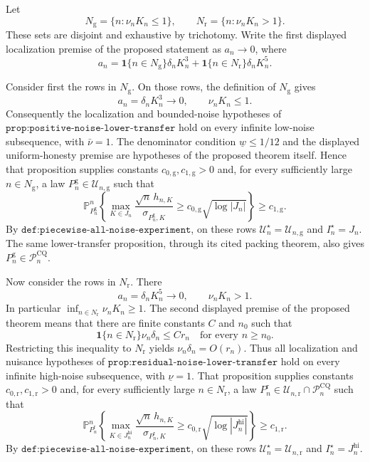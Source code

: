 Let
\[
 N_{\mathrm g}=\{n:\nu_nK_n\leq1\},
 \qquad
 N_{\mathrm r}=\{n:\nu_nK_n>1\}.
\]
These sets are disjoint and exhaustive by trichotomy.  Write the first displayed localization premise of the proposed statement as \(a_n\to0\), where
\[
 a_n=
 \mathbf 1\{n\in N_{\mathrm g}\}\delta_nK_n^3
 +\mathbf 1\{n\in N_{\mathrm r}\}\delta_nK_n^5.
\]

Consider first the rows in \(N_{\mathrm g}\).  On those rows, the definition of \(N_{\mathrm g}\) gives
\[
 a_n=\delta_nK_n^3\to0,
 \qquad
 \nu_nK_n\leq1.
\]
Consequently the localization and bounded-noise hypotheses of \(\texttt{prop:positive-noise-lower-transfer}\) hold on every infinite low-noise subsequence, with \(\bar\nu=1\).  The denominator condition \(\underline w\leq1/12\) and the displayed uniform-honesty premise are hypotheses of the proposed theorem itself.  Hence that proposition supplies constants \(c_{0,\mathrm g},c_{1,\mathrm g}>0\) and, for every sufficiently large \(n\in N_{\mathrm g}\), a law \(P_n^{\mathrm g}\in\mathcal U_{n,\mathrm g}\) such that
\[
 \mathbb P_{P_n^{\mathrm g}}^n\!\left\{
 \max_{K\in J_n}
 \frac{\sqrt n\,h_{n,K}}{\sigma_{P_n^{\mathrm g},K}}
 \geq c_{0,\mathrm g}\sqrt{\log|J_n|}
 \right\}\geq c_{1,\mathrm g}.
\]
By \(\texttt{def:piecewise-all-noise-experiment}\), on these rows \(\mathcal U_n^\star=\mathcal U_{n,\mathrm g}\) and \(I_n^\star=J_n\).  The same lower-transfer proposition, through its cited packing theorem, also gives \(P_n^{\mathrm g}\in\mathcal P_n^{\mathrm{CQ}}\).

Now consider the rows in \(N_{\mathrm r}\).  There
\[
 a_n=\delta_nK_n^5\to0,
 \qquad
 \nu_nK_n>1.
\]
In particular \(\inf_{n\in N_{\mathrm r}}\nu_nK_n\geq1\).  The second displayed premise of the proposed theorem means that there are finite constants \(C\) and \(n_0\) such that
\[
 \mathbf 1\{n\in N_{\mathrm r}\}\nu_n\delta_n\leq Cr_n
 \quad\text{for every }n\geq n_0.
\]
Restricting this inequality to \(N_{\mathrm r}\) yields \(\nu_n\delta_n=O(r_n)\).  Thus all localization and nuisance hypotheses of \(\texttt{prop:residual-noise-lower-transfer}\) hold on every infinite high-noise subsequence, with \(\underline\nu=1\).  That proposition supplies constants \(c_{0,\mathrm r},c_{1,\mathrm r}>0\) and, for every sufficiently large \(n\in N_{\mathrm r}\), a law \(P_n^{\mathrm r}\in\mathcal U_{n,\mathrm r}\cap\mathcal P_n^{\mathrm{CQ}}\) such that
\[
 \mathbb P_{P_n^{\mathrm r}}^n\!\left\{
 \max_{K\in J_n^{\mathrm{hi}}}
 \frac{\sqrt n\,h_{n,K}}{\sigma_{P_n^{\mathrm r},K}}
 \geq c_{0,\mathrm r}\sqrt{\log|J_n^{\mathrm{hi}}|}
 \right\}\geq c_{1,\mathrm r}.
\]
By \(\texttt{def:piecewise-all-noise-experiment}\), on these rows \(\mathcal U_n^\star=\mathcal U_{n,\mathrm r}\) and \(I_n^\star=J_n^{\mathrm{hi}}\).

